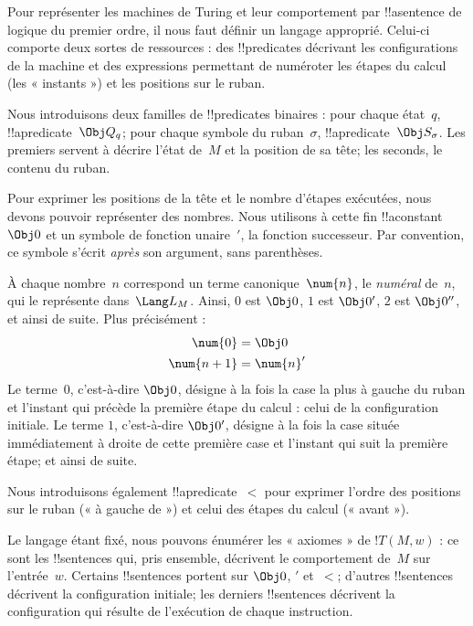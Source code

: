 \documentclass[../../../include/open-logic-section]{subfiles}
\begin{document}

\begin{explain}
Pour représenter les machines de Turing et leur comportement par
!!a{sentence} de logique du premier ordre, il nous faut définir un
langage approprié. Celui-ci comporte deux sortes de ressources :
des !!{predicate}s décrivant les configurations de la machine et
des expressions permettant de numéroter les étapes du calcul
(les « instants ») et les positions sur le ruban.

Nous introduisons deux familles de !!{predicate}s binaires :
pour chaque état~$q$, !!a{predicate}~$\Obj Q_q$; pour chaque
symbole du ruban~$\sigma$, !!a{predicate}~$\Obj S_\sigma$.
Les premiers servent à décrire l'état de~$M$ et la position de sa
tête; les seconds, le contenu du ruban.

Pour exprimer les positions de la tête et le nombre d'étapes
exécutées, nous devons pouvoir représenter des nombres. Nous
utilisons à cette fin !!a{constant}~$\Obj 0$ et un symbole de fonction
unaire~$\prime$, la fonction successeur. Par convention, ce symbole
s'écrit \emph{après} son argument, sans parenthèses.

À chaque nombre~$n$ correspond un terme canonique~$\num{n}$,
le \emph{numéral} de~$n$, qui le représente dans~$\Lang L_M$.
Ainsi, $\num{0}$ est $\Obj 0$, $\num{1}$ est $\Obj 0'$,
$\num{2}$ est $\Obj 0''$, et ainsi de suite. Plus précisément :
\begin{align*}
\num{0} & = \Obj 0 \\
\num{n+1} &= \num{n}'
\end{align*}
Le terme~$\num{0}$, c'est-à-dire $\Obj 0$, désigne à la fois la
case la plus à gauche du ruban et l'instant qui précède la première
étape du calcul : celui de la configuration initiale. Le terme
$\num{1}$, c'est-à-dire $\Obj 0'$, désigne à la fois la case située
immédiatement à droite de cette première case et l'instant qui suit
la première étape; et ainsi de suite.

Nous introduisons également !!a{predicate}~$<$ pour exprimer
l'ordre des positions sur le ruban (« à gauche de ») et celui des
étapes du calcul (« avant »).

Le langage étant fixé, nous pouvons énumérer les « axiomes » de
$!T(M,w)$ : ce sont les !!{sentence}s qui, pris ensemble, décrivent
le comportement de~$M$ sur l'entrée~$w$. Certains !!{sentence}s
portent sur $\Obj 0$, $\prime$ et~$<$; d'autres !!{sentence}s
décrivent la configuration initiale; les derniers !!{sentence}s
décrivent la configuration qui résulte de l'exécution de chaque
instruction.
\end{explain}
\end{document}
